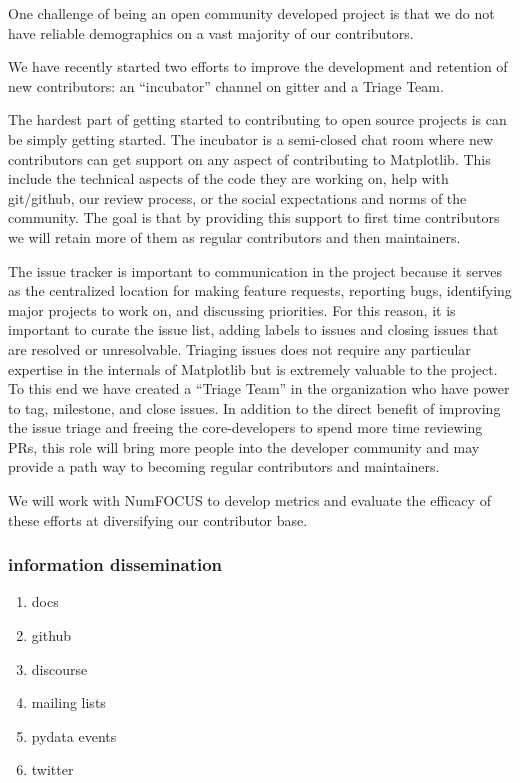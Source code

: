 \documentclass[12pt]{article}
\numberwithin{page}{section}
\begin{document}
One challenge of being an open community developed project is that we do not
have reliable demographics on a vast majority of our contributors.

We have recently started two efforts to improve the development and
retention of new contributors: an ``incubator'' channel on gitter and
a Triage Team.

The hardest part of getting started to contributing to open source
projects is can be simply getting started.  The incubator is a
semi-closed chat room where new contributors can get support on any
aspect of contributing to Matplotlib.  This include the technical
aspects of the code they are working on, help with git/github, our
review process, or the social expectations and norms of the community.  The
goal is that by providing this support to first time contributors we will
retain more of them as regular contributors and then maintainers.

The issue tracker is important to communication in the project because
it serves as the centralized location for making feature requests,
reporting bugs, identifying major projects to work on, and discussing
priorities.  For this reason, it is important to curate the issue
list, adding labels to issues and closing issues that are resolved or
unresolvable. Triaging issues does not require any particular
expertise in the internals of Matplotlib but is extremely valuable to
the project.  To this end we have created a ``Triage Team'' in the
organization who have power to tag, milestone, and close issues.  In
addition to the direct benefit of improving the issue triage and
freeing the core-developers to spend more time reviewing PRs, this
role will bring more people into the developer community and may
provide a path way to becoming regular contributors and maintainers.


We will work with NumFOCUS to develop metrics and evaluate the efficacy of
these efforts at diversifying our contributor base.

\subsubsection{information dissemination}
\begin{enumerate}
\item docs
\item github
\item discourse
\item mailing lists
\item pydata events
\item twitter
\end{enumerate}
\end{document}
